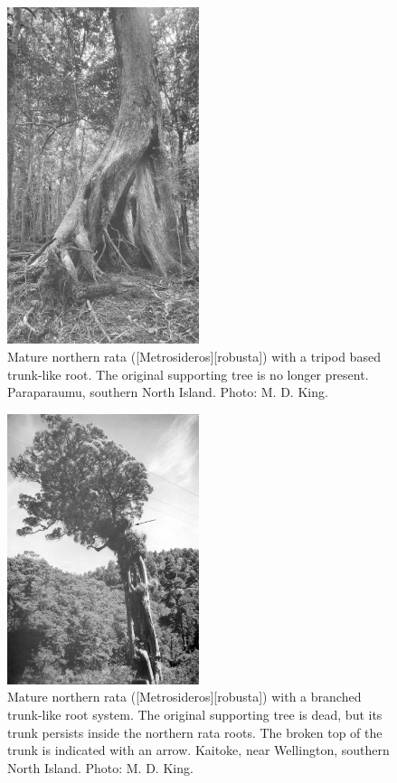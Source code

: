 \begin{figure}
	\includegraphics[width=0.5\textwidth]{graphics/figure51rata.jpg}
	\centering
	\caption[Mature northern rata with a tripod based trunk-like root]{Mature northern rata ([Metrosideros][robusta]) with a tripod based trunk-like root.
	The original supporting tree is no longer present.
	Paraparaumu, southern North Island.
	Photo: M. D. King.}%
	\label{fig:51rata}
\end{figure}

\begin{figure}
	\includegraphics[width=0.5\textwidth]{graphics/figure52rata-branched.jpg}
	\centering
	\caption[Mature northern rata with a branched trunk-like root system]{Mature northern rata ([Metrosideros][robusta]) with a branched trunk-like root system.
The original supporting tree is dead, but its trunk persists inside the northern rata roots.
The broken top of the trunk is indicated with an arrow.
Kaitoke, near Wellington, southern North Island.
	Photo: M. D. King.}%
	\label{fig:52rata-branched}
\end{figure}


